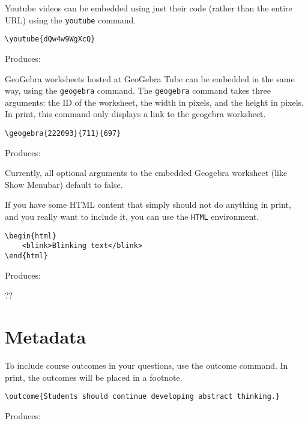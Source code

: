 \documentclass{ximera}
\begin{document}
\begin{example} Youtube videos can be embedded using just their code (rather than the entire URL) using the \verb!youtube! command.

\begin{verbatim}
\youtube{dQw4w9WgXcQ}
\end{verbatim}

Produces:

\end{example}

\begin{example} GeoGebra worksheets hosted at GeoGebra Tube can be embedded in the same way, using the \verb!geogebra! command. The \verb!geogebra! command takes three arguments: the ID of the worksheet, the width in pixels, and the height in pixels. In print, this command only displays a link to the geogebra worksheet.

\begin{verbatim}
\geogebra{222093}{711}{697}
\end{verbatim}

Produces: 


\begin{remark} 
  Currently, all optional arguments to the embedded Geogebra worksheet (like Show Menubar) default to false.
\end{remark}

\end{example}

\begin{example} If you have some HTML content that simply should not do anything in print, and you really want to include it, you can use the \verb!HTML! environment. 

\begin{verbatim}
\begin{html}
    <blink>Blinking text</blink> 
\end{html}
\end{verbatim}

Produces: 

??

\end{example}

\section{Metadata} \label{Metadata}

\begin{example} To include course outcomes in your questions, use the outcome command. In print, the outcomes will be placed in a footnote.

\begin{verbatim}
\outcome{Students should continue developing abstract thinking.}
\end{verbatim}

Produces:

\end{example}
\end{document}
